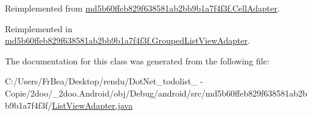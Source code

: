 Reimplemented from \hyperlink{classmd5b60ffeb829f638581ab2bb9b1a7f4f3f_1_1_cell_adapter_954a374de657ac52ab7febec23bbae94}{md5b60ffeb829f638581ab2bb9b1a7f4f3f.CellAdapter}.

Reimplemented in \hyperlink{classmd5b60ffeb829f638581ab2bb9b1a7f4f3f_1_1_grouped_list_view_adapter_aa8849c73c487cac5b8a78f850930321}{md5b60ffeb829f638581ab2bb9b1a7f4f3f.GroupedListViewAdapter}.

The documentation for this class was generated from the following file:\begin{CompactItemize}
\item 
C:/Users/FrBea/Desktop/rendu/DotNet\_\-todolist\_ - Copie/2doo/\_\-2doo.Android/obj/Debug/android/src/md5b60ffeb829f638581ab2bb9b1a7f4f3f/\hyperlink{_list_view_adapter_8java}{ListViewAdapter.java}\end{CompactItemize}
